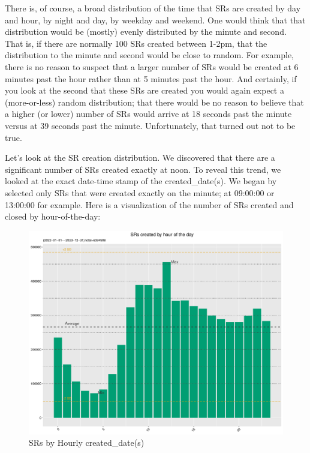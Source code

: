 \documentclass[12pt, titlepage]{article}
\begin{document}
{	There is, of course, a broad distribution of the time that SRs are created by day and hour, by night and day, by weekday and weekend. 
	One would think that that distribution would be (mostly) evenly distributed by the minute and second. That is, 
	if there are normally 100 SRs created between 1-2pm, that the distribution to the minute and second 
	would be close to random. For example, there is no reason to suspect that a larger number of SRs would be 
	created at 6 minutes past the hour rather than at 5 minutes past the hour. And certainly, if you look at the second that these SRs
	are created you would again expect a (more-or-less) random distribution; that there would be no reason to believe 
	that a higher (or lower) number of SRs would arrive at 18 seconds past the minute versus at 39 seconds past the minute.
	Unfortunately, that turned out not to be true.
	
	Let's look at the SR creation distribution. We discovered that there are a significant number of SRs created exactly at noon. To reveal this
	trend, we looked at the exact date-time stamp of the created\_date(s). We began by selected only SRs that were created exactly on the minute;
	at 09:00:00 or 13:00:00 for example.  Here is a visualization of the number of SRs created and closed by hour-of-the-day:
	
	\begin{figure}[tbp]
		\centering
		\includegraphics[width = \textwidth]{Created_Hourly_SR_count.pdf}
		\caption{SRs by Hourly created\_date(s)}
		\label{fig:hourly-created}
	\end{figure}	
	
}
\end{document}
